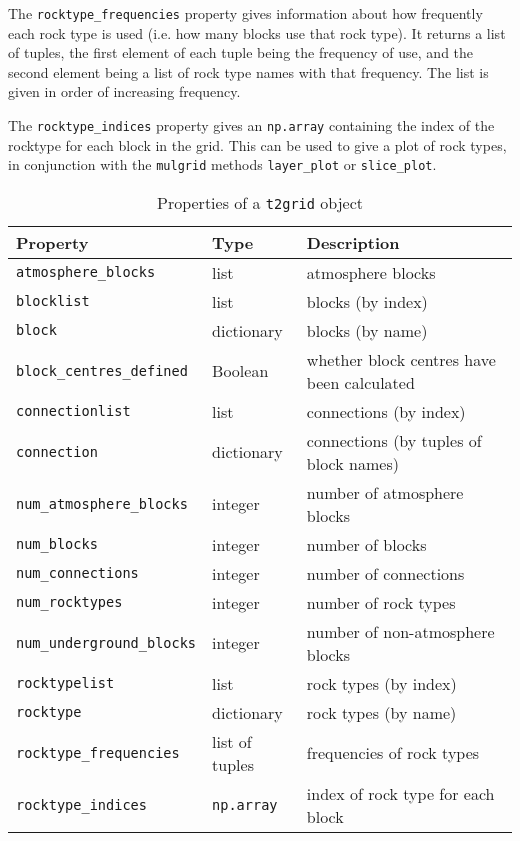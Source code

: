 The \texttt{rocktype\_frequencies} property gives information about how frequently each rock type is used (i.e. how many blocks use that rock type).  It returns a list of tuples, the first element of each tuple being the frequency of use, and the second element being a list of rock type names with that frequency.  The list is given in order of increasing frequency.

The \texttt{rocktype\_indices} property gives an \texttt{np.array} containing the index of the rocktype for each block in the grid.  This can be used to give a plot of rock types, in conjunction with the \texttt{mulgrid} methods \texttt{layer\_plot} or \texttt{slice\_plot}.

\begin{table}
  \begin{center}
    \begin{tabular}{|l|l|l|}
      \hline
      \textbf{Property} & \textbf{Type} & \textbf{Description}\\
      \hline
      \texttt{atmosphere\_blocks} & list & atmosphere blocks\\
      \texttt{blocklist} & list & blocks (by index)\\
      \texttt{block} & dictionary & blocks (by name)\\
      \texttt{block\_centres\_defined} & Boolean & whether block centres have been calculated\\
      \texttt{connectionlist} & list & connections (by index)\\
      \texttt{connection} & dictionary & connections (by tuples of block names)\\
      \texttt{num\_atmosphere\_blocks} & integer & number of atmosphere blocks\\
      \texttt{num\_blocks} & integer & number of blocks\\
      \texttt{num\_connections} & integer & number of connections\\
      \texttt{num\_rocktypes} & integer & number of rock types\\
      \texttt{num\_underground\_blocks} & integer & number of non-atmosphere blocks\\
      \texttt{rocktypelist} & list & rock types (by index)\\
      \texttt{rocktype} & dictionary & rock types (by name)\\
      \texttt{rocktype\_frequencies} & list of tuples & frequencies of rock types\\
      \texttt{rocktype\_indices} & \texttt{np.array} & index of rock type for each block\\
      \hline
    \end{tabular}
    \caption{Properties of a \texttt{t2grid} object}
    \label{tb:t2grid_properties}
  \end{center}
\end{table}

